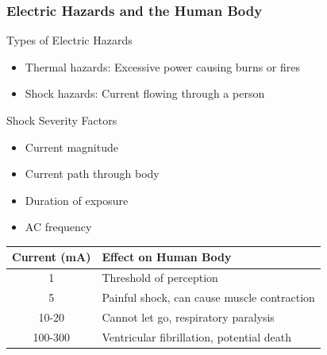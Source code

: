 \documentclass{beamer}
\begin{document}
\begin{frame}
    \frametitle{Electric Hazards and the Human Body}
    \begin{block}{Types of Electric Hazards}
        \begin{itemize}
            \item Thermal hazards: Excessive power causing burns or fires
            \item Shock hazards: Current flowing through a person
        \end{itemize}
    \end{block}
    \begin{block}{Shock Severity Factors}
        \begin{itemize}
            \item Current magnitude
            \item Current path through body
            \item Duration of exposure
            \item AC frequency
        \end{itemize}
    \end{block}
    \begin{center}
        \begin{tabular}{|c|l|}
            \hline
            \textbf{Current (mA)} & \textbf{Effect on Human Body} \\
            \hline
            1 & Threshold of perception \\
            5 & Painful shock, can cause muscle contraction \\
            10-20 & Cannot let go, respiratory paralysis \\
            100-300 & Ventricular fibrillation, potential death \\
            \hline
        \end{tabular}
    \end{center}
\end{frame}
\end{document}
